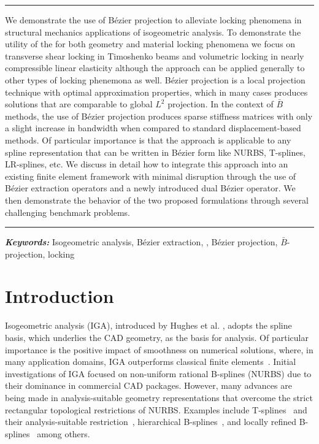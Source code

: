 \documentclass{article}
\newcommand{\Bezier}{{B\'{e}zier} }
\renewenvironment{abstract}{%
\hfill\begin{minipage}{0.95\textwidth}
\rule{\textwidth}{1pt}}
{\par\noindent\rule{\textwidth}{1pt}\end{minipage}}
\providecommand{\keywords}[1]{\textbf{\textit{Keywords: }}#1}
\begin{document}
\begin{abstract}
  We demonstrate the use of B\'{e}zier projection to alleviate locking phenomena in structural mechanics applications of isogeometric analysis.  To demonstrate the utility of the \added{\Bezier projection} for both geometry and material locking phenomena we focus on transverse shear locking in Timoshenko beams and volumetric locking in nearly compressible linear elasticity although the approach can be applied generally to other types of locking phenemona as well. B\'{e}zier projection is a local projection technique with optimal approximation properties, which in many cases produces solutions that are comparable to global $L^2$ projection. In the context of $\bar{B}$ methods, the use of B\'ezier projection produces sparse stiffness matrices with only a slight increase in bandwidth when compared to standard displacement-based methods. Of particular importance is that the approach is applicable to any spline representation that can be written in B\'ezier form like NURBS, T-splines, LR-splines, etc. We discuss in detail how to integrate this approach into an existing finite element framework with minimal disruption through the use of B\'ezier extraction operators and a newly introduced dual  \Bezier {} operator. We then demonstrate the behavior of the two proposed formulations through several challenging benchmark problems.
\end{abstract}
\keywords{Isogeometric analysis, B\'ezier extraction, \added{\Bezier dual basis}, B\'ezier projection, $\bar{B}$-projection, locking}
\section{Introduction}
Isogeometric analysis (IGA), introduced by Hughes et al. \cite{hughes_isogeometric_2005}, adopts the spline basis, which underlies the CAD geometry, as the basis for analysis. Of particular importance is the positive impact of smoothness on numerical solutions, where, in many application domains, IGA outperforms classical finite elements~\cite{cottrell_isogeometric_2009,cottrell_studies_2007,cottrell2006isogeometric,hughes_duality_2008,bazilevs_isogeometric_2010,evans_n-widths_2009}. Initial investigations of IGA focused on non-uniform rational B-splines (NURBS) due to their dominance in commercial CAD packages. However, many advances are being made in analysis-suitable geometry representations that overcome the strict rectangular topological restrictions of NURBS. Examples include T-splines~\cite{bazilevs_isogeometric_2010,sederberg_t-splines_2003} and their analysis-suitable restriction~\cite{scott_local_2012, li_analysis-suitable_2013}, hierarchical B-splines~\cite{bornemann_subdivision-based_2013,scott_isogeometric_2014,schillinger_isogeometric_2012,evans_hierarchical_2015,forsey_hierarchical_1988}, and locally refined B-splines~\cite{dokken_polynomial_2013,johannessen_isogeometric_2014} among others.
\end{document}
